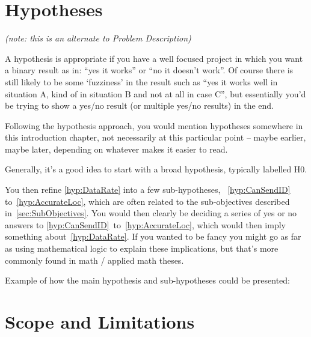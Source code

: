 \section{Hypotheses}

\emph{(note: this is an alternate to Problem Description)}

A hypothesis is appropriate if you have a well focused project in which you want a binary result as in: ``yes it works'' or ``no it doesn't work''. Of course there is still likely to be some `fuzziness' in the result such as ``yes it works well in situation A, kind of in situation B and not at all in case C'', but essentially you'd be trying to show a yes/no result (or multiple yes/no results) in the end.

Following the hypothesis approach, you would mention hypotheses somewhere in this introduction chapter, not necessarily at this particular point -- maybe earlier, maybe later, depending on whatever makes it easier to read.

Generally, it's a good idea to start with a broad hypothesis, typically labelled H0.

You then refine \ref{hyp:DataRate} into a few sub-hypotheses, \eg~\ref{hyp:CanSendID} to~\ref{hyp:AccurateLoc}, which are often related to the sub-objectives described in~\ref{sec:SubObjectives}. You would then clearly be deciding a series of yes or no answers to \ref{hyp:CanSendID}~to~\ref{hyp:AccurateLoc}, which would then imply something about~\ref{hyp:DataRate}. If you wanted to be fancy you might go as far as using mathematical logic to explain these implications, but that's more commonly found in math / applied math theses.

Example of how the main hypothesis and sub-hypotheses could be presented:




\section{Scope and Limitations}

